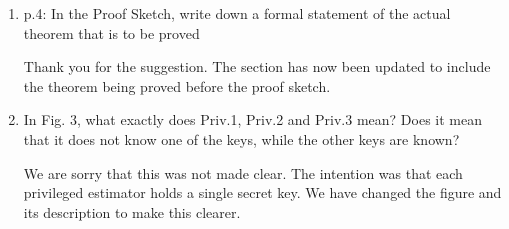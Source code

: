 \documentclass[a4paper]{scrartcl}
\newenvironment{rebuttal}{\begin{enumerate}[label={\color{grey}\thesection.\arabic{enumi}},leftmargin=0pt,ref=\thesection.\arabic{enumi}]}{\end{enumerate}}
\newcommand{\reviewtext}[1]{{\color{nblue} #1}}
\begin{document}
\begin{rebuttal}
\item \reviewtext{p.4: In the Proof Sketch, write down a formal statement of the actual theorem that is to be proved}

Thank you for the suggestion. The section has now been updated to include the theorem being proved before the proof sketch.

\item \reviewtext{In Fig. 3, what exactly does  Priv.1, Priv.2 and Priv.3 mean? Does it
mean that it does not know one of the keys, while the other keys are
known?}

We are sorry that this was not made clear. The intention was that each privileged estimator holds a single secret key. We have changed the figure and its description to make this clearer.

\end{rebuttal}

\end{document}
